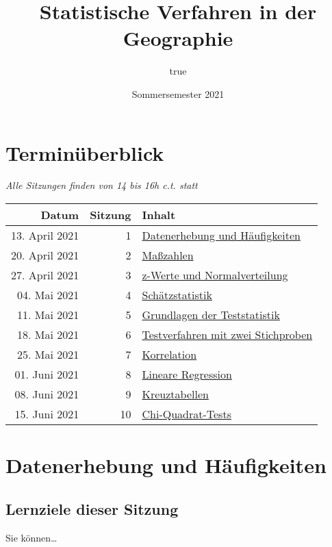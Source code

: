 \documentclass[
  ngerman,
]{article}
\title{Statistische Verfahren in der Geographie}
\author{true}
\date{Sommersemester 2021}
\begin{document}
\maketitle

{
\setcounter{tocdepth}{2}
\tableofcontents
}
\hypertarget{terminuxfcberblick}{%
\section*{Terminüberblick}\label{terminuxfcberblick}}

\emph{Alle Sitzungen finden von 14 bis 16h c.t. statt}

\begin{longtable}[]{@{}rrl@{}}
\toprule
Datum & Sitzung & Inhalt\tabularnewline
\midrule
\endhead
13. April 2021 & 1 & \protect\hyperlink{datenerhebung-und-huxe4ufigkeiten}{Datenerhebung und Häufigkeiten}\tabularnewline
20. April 2021 & 2 & \protect\hyperlink{mauxdfzahlen}{Maßzahlen}\tabularnewline
27. April 2021 & 3 & \protect\hyperlink{z-werte-und-normalverteilung}{z-Werte und Normalverteilung}\tabularnewline
04. Mai 2021 & 4 & \protect\hyperlink{schuxe4tzstatistik-1}{Schätzstatistik}\tabularnewline
11. Mai 2021 & 5 & \protect\hyperlink{grundlagen-der-teststatistik}{Grundlagen der Teststatistik}\tabularnewline
18. Mai 2021 & 6 & \protect\hyperlink{testverfahren-mit-zwei-stichproben}{Testverfahren mit zwei Stichproben}\tabularnewline
25. Mai 2021 & 7 & \protect\hyperlink{korrelation}{Korrelation}\tabularnewline
01. Juni 2021 & 8 & \protect\hyperlink{lineare-regression}{Lineare Regression}\tabularnewline
08. Juni 2021 & 9 & \protect\hyperlink{kreuztabellen}{Kreuztabellen}\tabularnewline
15. Juni 2021 & 10 & \protect\hyperlink{chi-quadrat-tests}{Chi-Quadrat-Tests}\tabularnewline
\bottomrule
\end{longtable}

\hypertarget{datenerhebung-und-huxe4ufigkeiten}{%
\section{Datenerhebung und Häufigkeiten}\label{datenerhebung-und-huxe4ufigkeiten}}

\hypertarget{lernziele-dieser-sitzung}{%
\subsection{Lernziele dieser Sitzung}\label{lernziele-dieser-sitzung}}

Sie können\ldots{}
\end{document}
